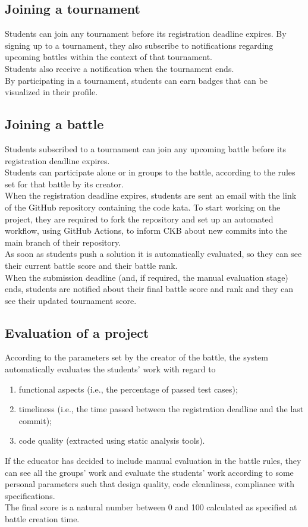 \subsection{Joining a tournament}
Students can join any tournament before its registration deadline expires. By signing up to a tournament, they also 
subscribe to notifications regarding upcoming battles within the context of that tournament.\\
Students also receive a notification when the tournament ends.\\
By participating in a tournament, students can earn badges that can be visualized in their profile.\\

\subsection{Joining a battle}
Students subscribed to a tournament can join any upcoming battle before its registration deadline expires.\\
Students can participate alone or in groups to the battle, according to the rules set for that battle by its creator.\\
When the registration deadline expires, students are sent an email with the link of the GitHub repository containing the 
code kata. To start working on the project, they are required to fork the repository and set up an automated workflow, 
using GitHub Actions, to inform CKB about new commits into the main branch of their repository.\\
As soon as students push a solution it is automatically evaluated, so they can see their current battle score and their 
battle rank.\\
When the submission deadline (and, if required, the manual evaluation stage) ends, students are notified about their final 
battle score and rank and they can see their updated tournament score.\\

\subsection{Evaluation of a project}
According to the parameters set by the creator of the battle, the system automatically evaluates the students' work with regard to
\begin{enumerate}
  \item functional aspects (i.e., the percentage of passed test cases);
  \item timeliness (i.e., the time passed between the registration deadline and the last commit);
  \item code quality (extracted using static analysis tools).
\end{enumerate}
If the educator has decided to include manual evaluation in the battle rules, they can see all the groups' work and evaluate 
the students' work according to some personal parameters such that design quality, code cleanliness, compliance with specifications.\\
The final score is a natural number between 0 and 100 calculated as specified at battle creation time.\\

